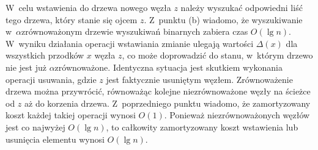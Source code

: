 \subproblem %
W~celu wstawienia do drzewa nowego węzła $z$ należy wyszukać odpowiedni liść tego drzewa, który stanie się ojcem $z$.
Z~punktu (b) wiadomo, że wyszukiwanie w~$\alpha$\nbhyphen zrównoważonym drzewie wyszukiwań binarnych zabiera czas $O(\lg n)$.
W~wyniku działania operacji wstawiania zmianie ulegają wartości $\Delta(x)$ dla wszystkich przodków $x$ węzła $z$, co może doprowadzić do stanu, w~którym drzewo nie jest już $\alpha$\nbhyphen zrównoważone.
Identyczna sytuacja jest skutkiem wykonania operacji usuwania, gdzie $z$ jest faktycznie usuniętym węzłem.
Zrównoważenie drzewa można przywrócić, równoważąc kolejne niezrównoważone węzły na ścieżce od $z$ aż do korzenia drzewa.
Z~poprzedniego punktu wiadomo, że zamortyzowany koszt każdej takiej operacji wynosi $O(1)$.
Ponieważ niezrównoważonych węzłów jest co najwyżej $O(\lg n)$, to całkowity zamortyzowany koszt wstawienia lub usunięcia elementu wynosi $O(\lg n)$.
